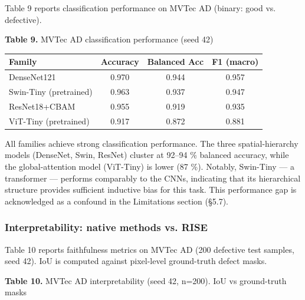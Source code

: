 \documentclass[11pt,a4paper]{article}
\begin{document}
Table 9 reports classification performance on MVTec AD (binary: good vs. defective).

\begin{center}
\small \textbf{Table 9.} MVTec AD classification performance (seed 42)
\end{center}

\begin{tabular}{lccc}
\toprule
Family & Accuracy & Balanced Acc & F1 (macro) \\
\midrule
DenseNet121 & 0.970 & 0.944 & 0.957 \\
Swin-Tiny (pretrained) & 0.963 & 0.937 & 0.947 \\
ResNet18+CBAM & 0.955 & 0.919 & 0.935 \\
ViT-Tiny (pretrained) & 0.917 & 0.872 & 0.881 \\
\bottomrule
\end{tabular}


All families achieve strong classification performance. The three spatial-hierarchy models (DenseNet, Swin, ResNet) cluster at 92--94 \% balanced accuracy, while the global-attention model (ViT-Tiny) is lower (87 \%). Notably, Swin-Tiny --- a transformer --- performs comparably to the CNNs, indicating that its hierarchical structure provides sufficient inductive bias for this task. This performance gap is acknowledged as a confound in the Limitations section (\S{}5.7).

\subsubsection{Interpretability: native methods vs. RISE}

Table 10 reports faithfulness metrics on MVTec AD (200 defective test samples, seed 42). IoU is computed against pixel-level ground-truth defect masks.

\begin{center}
\small \textbf{Table 10.} MVTec AD interpretability (seed 42, n=200). IoU vs ground-truth masks
\end{center}

\noindent{}
\end{document}
